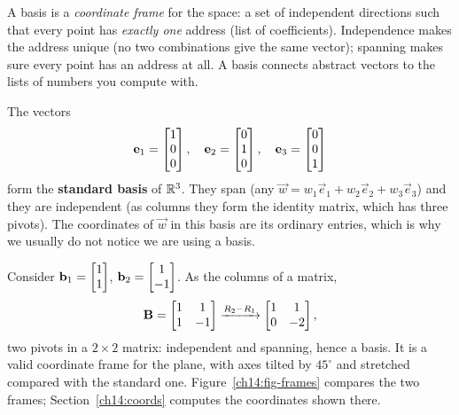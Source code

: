 \begin{intuitionbox}
A basis is a \emph{coordinate frame} for the space: a set of independent
directions such that every point has \emph{exactly one} address (list of coefficients). Independence
makes the address unique (no two combinations give the same vector);
spanning makes sure every point has an address at all. A basis connects
abstract vectors to the lists of numbers you compute with.
\end{intuitionbox}

\begin{example}
\label{ch14:ex-standard}
The vectors
\[
  \mathbf{e}_1=\begin{bmatrix}1\\0\\0\end{bmatrix},\quad
  \mathbf{e}_2=\begin{bmatrix}0\\1\\0\end{bmatrix},\quad
  \mathbf{e}_3=\begin{bmatrix}0\\0\\1\end{bmatrix}
\]
form the \textbf{standard basis} of $\mathbb{R}^3$. They span (any $\vec{w} = w_1\vec{e}_1
+ w_2\vec{e}_2 + w_3\vec{e}_3$) and they are independent (as columns they form the
identity matrix, which has three pivots). The coordinates of $\vec{w}$ in this basis are
its ordinary entries, which is why we usually do not notice we are using a
basis.
\end{example}

\begin{example}
\label{ch14:ex-nonstandard}
Consider $\mathbf{b}_1 = \begin{bmatrix}1\\1\end{bmatrix}$, $\mathbf{b}_2 = \begin{bmatrix}1\\-1\end{bmatrix}$. As the columns of a matrix,
\[
  \mathbf{B}=\begin{bmatrix} 1 & 1\\ 1 & -1\end{bmatrix}
  \xrightarrow{R_2-R_1}
  \begin{bmatrix} 1 & 1\\ 0 & -2\end{bmatrix},
\]
two pivots in a $2\times 2$ matrix: independent and spanning, hence a basis. It
is a valid coordinate frame for the plane, with axes tilted by $45^\circ$ and
stretched compared with the standard one. Figure~\ref{ch14:fig-frames} compares the
two frames; Section~\ref{ch14:coords} computes the coordinates shown there.
\end{example}

